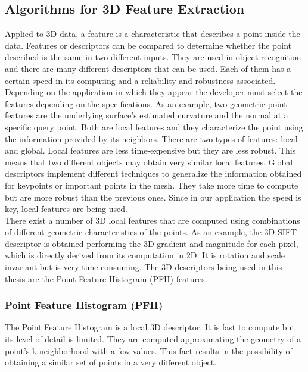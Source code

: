 \subsection{Algorithms for 3D Feature Extraction}
\label{3d_features}


Applied to 3D data, a feature is a characteristic that describes a point inside the data. Features or descriptors can be compared to determine whether the point described is the same in two different inputs. They are used in object recognition and there are many different descriptors that can be used. Each of them has a certain speed in its computing and a reliability and robustness associated.
\\

Depending on the application in which they appear the developer must select the features depending on the specifications. 
As an example, two geometric point features are the underlying surface's estimated curvature and the normal at a specific query point. 
Both are local features and they characterize the point using the information provided by its neighbors. 
There are two types of features: local and global. 
Local features are less time-expensive but they are less robust. 
This means that two different objects may obtain very similar local features.
Global descriptors implement different techniques to generalize the information obtained for keypoints or important points in the mesh. 
They take more time to compute but are more robust than the previous ones. 
Since in our application the speed is key, local features are being used. 
\\

There exist a number of 3D local features that are computed using combinations of different geometric characteristics of the points. 
As an example, the 3D SIFT descriptor \cite{Scovanner2007} is obtained performing the 3D gradient and magnitude for each pixel, which is directly derived from its computation in 2D. 
It is rotation and scale invariant but is very time-consuming. 
The 3D descriptors being used in this thesis are the Point Feature Histogram (PFH) features. 

\subsubsection{Point Feature Histogram (PFH)}
\label{pfh}

The Point Feature Histogram \cite{Rusu2008} is a local 3D descriptor. 
It is fast to compute but its level of detail is limited. 
They are computed approximating the geometry of a point's k-neighborhood with a few values. 
This fact results in the possibility of obtaining a similar set of points in a very different object. 
\\

